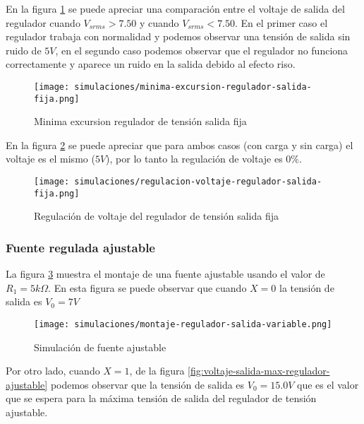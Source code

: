 En la figura \ref{fig:minima-excursion-regulador-salida-fija} se puede apreciar una comparación entre el voltaje de salida del regulador cuando $V_{srms} > 7.50$ y cuando $V_{srms} < 7.50$. En el primer caso el regulador trabaja con normalidad y podemos observar una tensión de salida sin ruido de $5V$, en el segundo caso podemos observar que el regulador no funciona correctamente y aparece un ruido en la salida debido al efecto riso.

\begin{figure}[ht]
    \centering
    \texttt{[image: simulaciones/minima-excursion-regulador-salida-fija.png]}
    \caption{Minima excursion regulador de tensión salida fija}
    \label{fig:minima-excursion-regulador-salida-fija}
\end{figure}

En la figura \ref{fig:regulacion-voltaje-regulador-salida-fija} se puede apreciar que para ambos casos (con carga y sin carga) el voltaje es el mismo ($5V$), por lo tanto la regulación de voltaje es 0\%.

\begin{figure}[ht]
    \centering
    \texttt{[image: simulaciones/regulacion-voltaje-regulador-salida-fija.png]}
    \caption{Regulación de voltaje del regulador de tensión salida fija}
    \label{fig:regulacion-voltaje-regulador-salida-fija}
\end{figure}

\FloatBarrier
\subsubsection*{Fuente regulada ajustable}

La figura \ref{fig:simulacion-fuente-ajustable} muestra el montaje de una fuente ajustable usando el valor de $R_1 = 5k \Omega$. En esta figura se puede observar que cuando $X=0$ la tensión de salida es $V_0 = 7 V$

\begin{figure}[ht]
    \centering
    \texttt{[image: simulaciones/montaje-regulador-salida-variable.png]}
    \caption{Simulación de fuente ajustable}
    \label{fig:simulacion-fuente-ajustable}
\end{figure}

Por otro lado, cuando $X=1$, de la figura \ref{fig:voltaje-salida-max-regulador-ajustable} podemos observar que la tensión de salida es $V_0 = 15.0 V$ que es el valor que se espera para la máxima tensión de salida del regulador de tensión ajustable.

